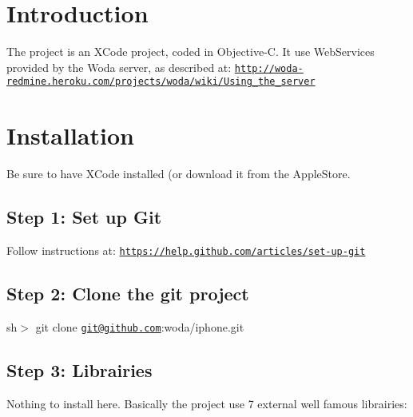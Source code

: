 \hypertarget{index_intro_sec}{}\section{Introduction}\label{index_intro_sec}
The project is an X\-Code project, coded in Objective-\/\-C. It use Web\-Services provided by the Woda server, as described at\-: \href{http://woda-redmine.heroku.com/projects/woda/wiki/Using_the_server}{\tt http\-://woda-\/redmine.\-heroku.\-com/projects/woda/wiki/\-Using\-\_\-the\-\_\-server}\hypertarget{index_install_sec}{}\section{Installation}\label{index_install_sec}
Be sure to have X\-Code installed (or download it from the Apple\-Store.\hypertarget{index_step1}{}\subsection{Step 1\-: Set up Git}\label{index_step1}
Follow instructions at\-: \href{https://help.github.com/articles/set-up-git}{\tt https\-://help.\-github.\-com/articles/set-\/up-\/git}\hypertarget{index_step2}{}\subsection{Step 2\-: Clone the git project}\label{index_step2}
sh$>$ git clone \href{mailto:git@github.com}{\tt git@github.\-com}\-:woda/iphone.\-git\hypertarget{index_step3}{}\subsection{Step 3\-: Librairies}\label{index_step3}
Nothing to install here. Basically the project use 7 external well famous librairies\-:
